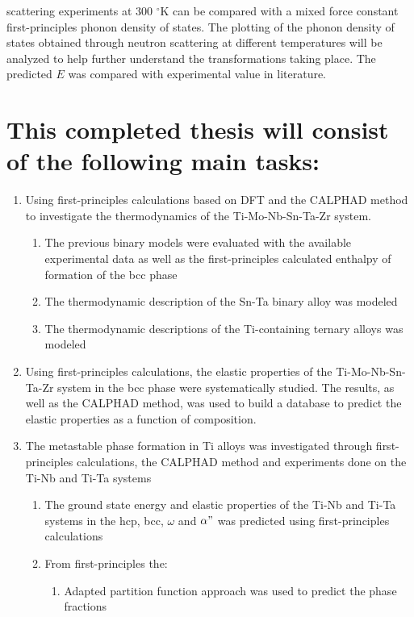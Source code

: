 scattering experiments at 300 $^\circ$K can be compared with a mixed force constant first-principles phonon density of states. The plotting of the phonon density of states obtained through neutron scattering at different temperatures will be analyzed to help further understand the transformations taking place. The predicted $E$ was compared with experimental value in literature.


\pagebreak
\section*{This completed thesis will consist of the following main tasks:}

\begin{enumerate}
	\item Using first-principles calculations based on DFT and the CALPHAD method to investigate the thermodynamics of the Ti-Mo-Nb-Sn-Ta-Zr system. 
	\begin{enumerate}
		\item The previous binary models were evaluated with the available experimental data as well as the first-principles calculated enthalpy of formation of the bcc phase
		\item The thermodynamic description of the Sn-Ta binary alloy was modeled
		\item The thermodynamic descriptions of the Ti-containing ternary alloys was modeled
	\end{enumerate}
	\item Using first-principles calculations, the elastic properties of the Ti-Mo-Nb-Sn-Ta-Zr system in the bcc phase were systematically studied. The results, as well as the CALPHAD method, was used to build a database to predict the elastic properties as a function of composition. 
	\item The metastable phase formation in Ti alloys was investigated through first-principles calculations, the CALPHAD method and experiments done on the Ti-Nb and Ti-Ta systems
	\begin{enumerate}
		\item The ground state energy and elastic properties of the Ti-Nb and Ti-Ta systems in the hcp, bcc, $\omega$ and $\alpha"$ was predicted using first-principles calculations
		\item From first-principles the:
			\begin{enumerate}
			\item Adapted partition function approach was used to predict the phase fractions

\end{enumerate}
\end{enumerate}
\end{enumerate}
